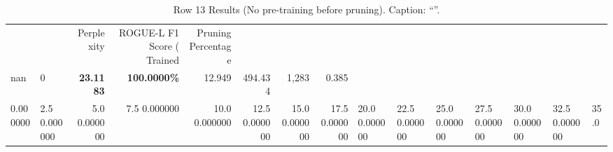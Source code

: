 \begin{table}
\caption{Row 13 Results (No pre-training before pruning). \ifshowcaption{}Caption: ``''.\fi}
\label{tab:evaluation-pipeline-13-untrained}
\begin{tabular}{llrrrrrr}
 &  & Perplexity & ROGUE-L F1 Score (%
Trained & Pruning Percentage &  &  &  &  &  &  \\
nan & 0 & \bfseries 23.1183 & \bfseries 100.0000\% & 12.949 & 494.434 & 1,283 & 0.385 \\
0.000000 & 2.5%
0.000000 & 5.0%
0.000000 & 7.5%
0.000000 & 10.0%
0.000000 & 12.5%
0.000000 & 15.0%
0.000000 & 17.5%
0.000000 & 20.0%
0.000000 & 22.5%
0.000000 & 25.0%
0.000000 & 27.5%
0.000000 & 30.0%
0.000000 & 32.5%
0.000000 & 35.0%

\end{tabular}
\end{table}
